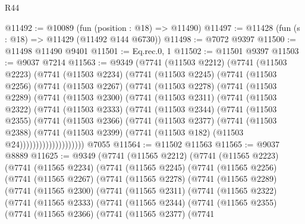 \begin{lexlean}{R44}
\begin{coremodule}
{@11492 := @10089 (fun (position : @18) => @11490)
@11497 := @11428 (fun (s : @18) => @11429 (@11492 @144 @6730))
@11498 := @7072 @9397
@11500 := @11498 @11490 @9401
@11501 := Eq.rec.{0, 1}
@11502 := @11501 @9397
@11503 := @9037 @7214
@11563 := @9349
    (@7741
      (@11503 @2212)
      (@7741
        (@11503 @2223)
        (@7741
          (@11503 @2234)
          (@7741
            (@11503 @2245)
            (@7741
              (@11503 @2256)
              (@7741
                (@11503 @2267)
                (@7741
                  (@11503 @2278)
                  (@7741
                    (@11503 @2289)
                    (@7741
                      (@11503 @2300)
                      (@7741
                        (@11503 @2311)
                        (@7741
                          (@11503 @2322)
                          (@7741
                            (@11503 @2333)
                            (@7741
                              (@11503 @2344)
                              (@7741
                                (@11503 @2355)
                                (@7741
                                  (@11503 @2366)
                                  (@7741
                                    (@11503 @2377)
                                    (@7741
                                      (@11503 @2388)
                                      (@7741
                                        (@11503 @2399)
                                        (@7741 (@11503 @182) (@11503 @24))))))))))))))))))))
    @7055
@11564 := @11502 @11563
@11565 := @9037 @8889
@11625 := @9349
    (@7741
      (@11565 @2212)
      (@7741
        (@11565 @2223)
        (@7741
          (@11565 @2234)
          (@7741
            (@11565 @2245)
            (@7741
              (@11565 @2256)
              (@7741
                (@11565 @2267)
                (@7741
                  (@11565 @2278)
                  (@7741
                    (@11565 @2289)
                    (@7741
                      (@11565 @2300)
                      (@7741
                        (@11565 @2311)
                        (@7741
                          (@11565 @2322)
                          (@7741
                            (@11565 @2333)
                            (@7741
                              (@11565 @2344)
                              (@7741
                                (@11565 @2355)
                                (@7741
                                  (@11565 @2366)
                                  (@7741
                                    (@11565 @2377)
                                    (@7741
}
\end{coremodule}
\end{lexlean}
